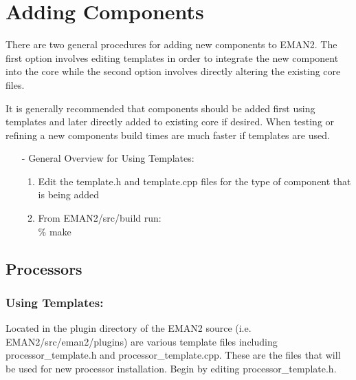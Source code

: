 \section{Adding Components}
  \label{ADDING-COMPONENTS}

There are two general procedures for adding new components to EMAN2.
The first option involves editing templates in order to integrate the
new component into the core while the second option involves directly
altering the existing core files.  

It is generally recommended that components should be added first
using templates and later directly added to existing core if 
desired.  When testing or refining a new components build times are much
faster if templates are used.  
\begin{itemize}
  \item[-]
    General Overview for Using Templates:
    \begin{enumerate}
    \item
      Edit the template.h and template.cpp files for the type of
      component that is being added
    \item
      From EMAN2/src/build run:\\
      \% make
    \end{enumerate}
\end{itemize}

\subsection{Processors}
  \label{ADDING-PROCESSORS} 

      \subsubsection{Using Templates:}
      Located in the plugin directory of the EMAN2 source
      (i.e. EMAN2/src/eman2/plugins) are various template files including
      processor\_template.h and processor\_template.cpp.  These are the files
      that will be used for new processor installation.  Begin by editing
      processor\_template.h. 

